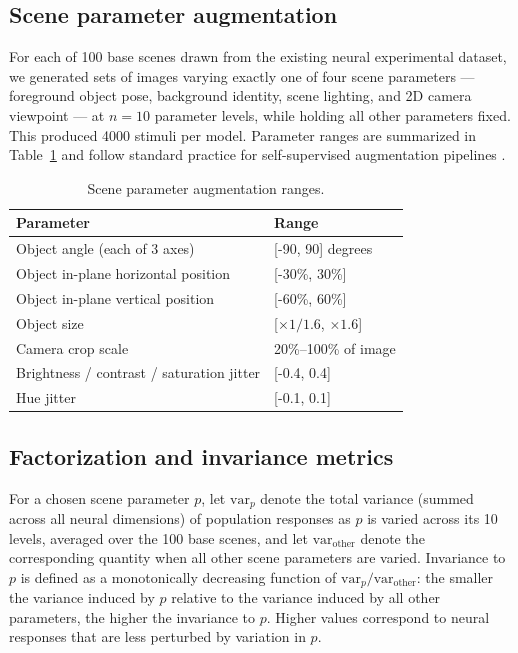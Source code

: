 \documentclass[11pt]{article}
\begin{document}
\subsection{Scene parameter augmentation}

For each of 100 base scenes drawn from the existing neural experimental
dataset, we generated sets of images varying exactly one of four scene
parameters --- foreground object pose, background identity, scene lighting,
and 2D camera viewpoint --- at \(n=10\) parameter levels, while holding all
other parameters fixed. This produced 4000 stimuli per model. Parameter
ranges are summarized in Table~\ref{tab:augparams} and follow standard
practice for self-supervised augmentation pipelines
\citep{chen2020simple, he2020momentum}.

\begin{table}[htbp]
\centering
\caption{Scene parameter augmentation ranges.}
\label{tab:augparams}
\begin{tabular}{ll}
\toprule
Parameter & Range \\
\midrule
Object angle (each of 3 axes) & [-90, 90] degrees \\
Object in-plane horizontal position & [-30\%, 30\%] \\
Object in-plane vertical position & [-60\%, 60\%] \\
Object size & [$\times 1/1.6$, $\times 1.6$] \\
Camera crop scale & 20\%--100\% of image \\
Brightness / contrast / saturation jitter & [-0.4, 0.4] \\
Hue jitter & [-0.1, 0.1] \\
\bottomrule
\end{tabular}
\end{table}

\subsection{Factorization and invariance metrics}

For a chosen scene parameter \(p\), let \(\mathrm{var}_{p}\) denote the
total variance (summed across all neural dimensions) of population responses
as \(p\) is varied across its 10 levels, averaged over the 100 base scenes,
and let \(\mathrm{var}_{\mathrm{other}}\) denote the corresponding quantity
when all other scene parameters are varied. Invariance to \(p\) is defined
as a monotonically decreasing function of
\(\mathrm{var}_{p}/\mathrm{var}_{\mathrm{other}}\): the smaller the variance
induced by \(p\) relative to the variance induced by all other parameters,
the higher the invariance to \(p\). Higher values correspond to neural
responses that are less perturbed by variation in \(p\).
\end{document}
